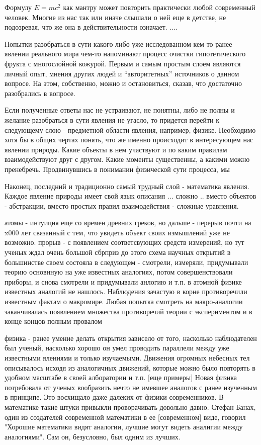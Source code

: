 Формулу $E = mc^2$ как мантру может повторить практически любой современный человек.
Многие из нас так или иначе слышали о ней еще в детстве, не подозревая, что же она в действительности означает.
....


Попытки разобраться в сути какого-либо уже исследованном кем-то ранее явлении реального мира чем-то напоминают процесс очистки гипотетического фрукта с многослойной кожурой.
Первым и самым простым слоем являются личный опыт, мнения других людей и ``авторитетных'' источников о данном вопросе. 
На этом, собственно, можно и остановиться, сказав, что достаточно разобрались в вопросе.

Если полученные ответы нас не устраивают, не понятны, либо не полны и желание разобраться в сути явления не угасло, то придется перейти к следующему слою - предметной области явления, например, физике.
Необходимо хотя бы в общих чертах понять, что же именно происходит в интересующем нас явлении природы. 
Какие объекты в нем участвуют и по каким правилам взаимодействуют друг с другом. Какие моменты существенны, а какими можно пренебречь.
Продвинувшись в понимании физической сути процесса, мы 

Наконец, последний и традиционно самый трудный слой - математика явления.
Каждое явление природы имеет свой язык описания  ...  сложно .. вместо объектов - абстракции, вместо простых правил взаимодействия - сложные уравнения.



атомы - интуиция еще со времен древних греков, но дальше - перерыв почти на x000 лет связанный с тем, что увидеть объект своих измышлений уже не возможно.
прорыв - с появлением соответсвующих средств измерений, но тут ученых ждал очень большой сбрприз
до этого схема научных открытий в большинстве своем состояла в следующем - смотрели, измеряли, придумывали теорию основнную на уже известных аналогиях, потом совершенствовали приборы, и снова смотрели и придумывали анлогию и т.п.
в атомной физике известных аналогий не нашлось. Наблюдения зачастую в корне противоречили известным фактам о макромире. Любая попытка смотреть на макро-аналогии заканчивалась появлением множества противоречий теории с экспериментом и в конце концов полным провалом 


физика - ранее умение делать открытия зависело от того, насколько наблюдателен был ученый, насколько хорошо он умел проводить параллели между уже известными ялениями и только изучаемыми.
Движения огромных небесных тел описывалось исходя из аналогичных движений, которые можно было повторять в удобном масштабе в своей алборатории и т.п. [еще примеры]
Новая физика потребовала от ученых вообразить нечто не имевшее аналогов с ранее изученным в принципе. 
Это восхищало даже далеких от физики современников.
В математике такие штуки привыкли проворачивать довольно давно. 
Стефан Банах, один из создателей современной математики в ее [современном] виде, говорил "Хорошие математики видят аналогии, лучшие могут видеть аналигии между аналогиями". Сам он, безусловно, был одним из лучших.

